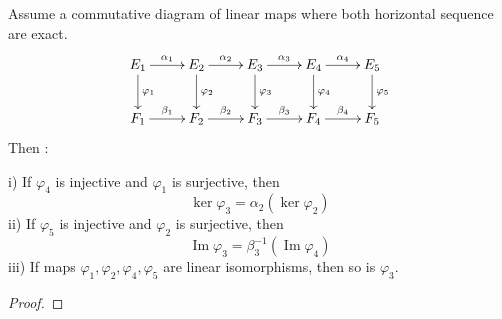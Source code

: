 \begin{theorem}[5-lemma]
Assume a commutative diagram of linear maps where both horizontal sequence are exact.
\[\xymatrix{
E_1 \ar[r]^{\alpha_1} \ar[d]^{\varphi_1} & E_2 \ar[r]^{\alpha_2} \ar[d]^{\varphi_2} & E_3 \ar[r]^{\alpha_3} \ar[d]^{\varphi_3} & E_4 \ar[r]^{\alpha_4} \ar[d]^{\varphi_4} & E_5 \ar[d]^{\varphi_5}\\
F_1 \ar[r]^{\beta_1} & F_2 \ar[r]^{\beta_2} & F_3 \ar[r]^{\beta_3} & F_4 \ar[r]^{\beta_4} &F_5}\]
Then :\par
i) If $\varphi_4$ is injective and $\varphi_1$ is surjective, then \[\ker \varphi_3= \alpha_2( \ker \varphi_2 )\]
ii) If $\varphi_5$ is injective and $\varphi_2$ is surjective, then \[ \operatorname{Im} \varphi_3=\beta_3^{-1} (\operatorname{Im} \varphi_4) \]
iii) If maps $\varphi_1,\varphi_2,\varphi_4,\varphi_5$ are linear isomorphisms, then so is $\varphi_3$. 
\end{theorem}
\begin{proof}

\end{proof}






















